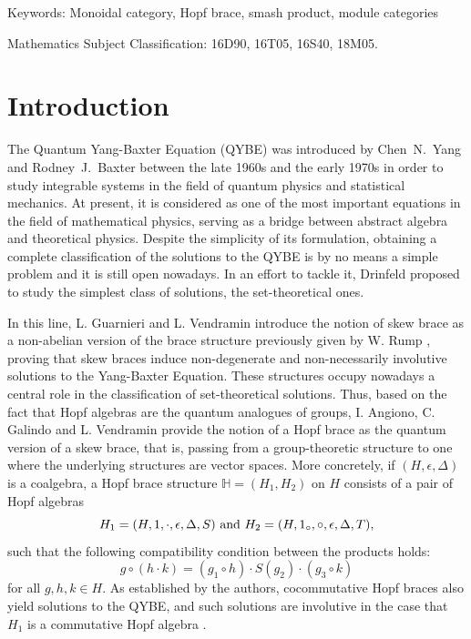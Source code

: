 \documentclass[11pt,reqno]{amsart}
\theoremstyle{plain}%
\theoremstyle{definition}
\theoremstyle{remark}
\begin{document}
 {\footnotesize {\sc Keywords}: Monoidal category, Hopf brace, smash product, module categories
 }
 
 {\footnotesize { Mathematics Subject Classification}: 16D90, 16T05, 16S40, 18M05. 
 }
	


\section{Introduction}
The Quantum Yang-Baxter Equation (QYBE) was introduced by Chen~N.~Yang \cite{Yang} and Rodney~J.~Baxter \cite{Bax} between the late 1960s and the early 1970s in order to study integrable systems in the field of quantum physics and statistical mechanics. At present, it is considered as one of the most important equations in the field of mathematical physics, serving as a bridge between abstract algebra and theoretical physics. Despite the simplicity of its formulation, obtaining a complete classification of the solutions to the QYBE is by no means a simple problem and it is still open nowadays. In an effort to tackle it, Drinfeld \cite{Drin} proposed to study the simplest class of solutions, the set-theoretical ones.

In this line, L. Guarnieri and L. Vendramin \cite{GV} introduce the notion of skew brace as a non-abelian version of the brace structure previously given by W. Rump \cite{Rump}, proving that skew braces induce non-degenerate and non-necessarily involutive solutions to the Yang-Baxter Equation. These structures occupy nowadays a central role in the classification of set-theoretical solutions.  Thus, based on the fact that Hopf algebras are the quantum analogues of groups, I. Angiono, C. Galindo and L. Vendramin \cite{AGV} provide the notion of a Hopf brace as the quantum version of a skew brace, that is, passing from a group-theoretic structure to one where the underlying structures are vector spaces. More concretely, if $(H,\epsilon,\Delta)$ is a coalgebra, a Hopf brace structure $\mathbb{H} = (H_1, H_2)$ on $H$ consists of a pair of Hopf algebras  \[H_{1}=(H,1,\cdot,\epsilon,\Delta,S) \textnormal{ and } H_{2}=(H,1_{\circ},\circ,\epsilon,\Delta,T),\] 
such that the following compatibility condition between the products holds:
\[g\circ(h\cdot k)=(g_{1}\circ h)\cdot S(g_{2})\cdot(g_{3}\circ k)\]
for all $g,h,k\in H$. As established by the authors, cocommutative Hopf braces also yield solutions to the QYBE, and such solutions are involutive in the case that $H_{1}$ is a commutative Hopf algebra \cite[Corollaries 2.4 and~2.5]{AGV}.
\end{document}

